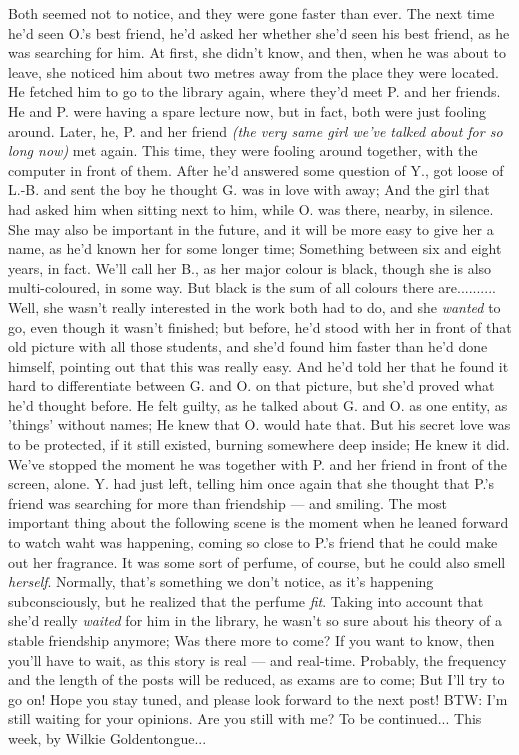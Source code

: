Both seemed not to notice, and they were gone faster than ever. 
The next time he'd seen O.'s best friend, he'd asked her whether she'd seen his best friend, as he was searching for him. At first, she didn't know, and then, when he was about to leave, she noticed him about two metres away from the place they were located. 
He fetched him to go to the library again, where they'd meet P. and her friends. He and P. were having a spare lecture now, but in fact, both were just fooling around. 
Later, he, P. and her friend \emph{(the very same girl we've talked about for so long now)} met again. This time, they were fooling around together, with the computer in front of them. After he'd answered some question of Y., got loose of L.-B. and sent the boy he thought G. was in love with away; And the girl that had asked him when sitting next to him, while O. was there, nearby, in silence. She may also be important in the future, and it will be more easy to give her a name, as he'd known her for some longer time; Something between six and eight years, in fact. We'll call her B., as her major colour is black, though she is also multi-coloured, in some way. But black is the sum of all colours there are..........
Well, she wasn't really interested in the work both had to do, and she \emph{wanted} to go, even though it wasn't finished; but before, he'd stood with her in front of that old picture with all those students, and she'd found him faster than he'd done himself, pointing out that this was really easy. And he'd told her that he found it hard to differentiate between G. and O. on that picture, but she'd proved what he'd thought before. 
He felt guilty, as he talked about G. and O. as one entity, as 'things' without names; He knew that O. would hate that. But his secret love was to be protected, if it still existed, burning somewhere deep inside; He knew it did. 
We've stopped the moment he was together with P. and her friend in front of the screen, alone. Y. had just left, telling him once again that she thought that P.'s friend was searching for more than friendship --- and smiling. 
The most important thing about the following scene is the moment when he leaned forward to watch waht was happening, coming so close to P.'s friend that he could make out her fragrance. It was some sort of perfume, of course, but he could also smell \emph{herself}. Normally, that's something we don't notice, as it's happening subconsciously, but he realized that the perfume \emph{fit}. Taking into account that she'd really \emph{waited} for him in the library, he wasn't so sure about his theory of a stable friendship anymore; Was there more to come?
If you want to know, then you'll have to wait, as this story is real --- and real-time. 
Probably, the frequency and the length of the posts will be reduced, as exams are to come; But I'll try to go on!
Hope you stay tuned, and please look forward to the next post!
BTW: I'm still waiting for your opinions. Are you still with me?
To be continued...
This week, by Wilkie Goldentongue...

